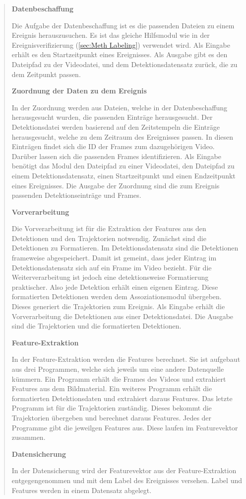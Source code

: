 \begin{quote}
\par
\textbf{Datenbeschaffung}\par
Die Aufgabe der Datenbeschaffung ist es die passenden Dateien zu einem Ereignis herauszusuchen. Es ist das gleiche Hilfsmodul wie in der Ereignisverifizierung (\autoref{sec:Meth Labeling}) verwendet wird. Als Eingabe erhält es den Startzeitpunkt eines Ereignisses. Als Ausgabe gibt es den Dateipfad zu der Videodatei, und dem Detektionsdatensatz zurück, die zu dem Zeitpunkt passen. \dubpar

\textbf{Zuordnung der Daten zu dem Ereignis}\par
In der Zuordnung werden aus Dateien, welche in der Datenbeschaffung herausgesucht wurden, die passenden Einträge herausgesucht. Der Detektionsdatei werden basierend auf den Zeitstempeln die Einträge herausgesucht, welche zu dem Zeitraum des Ereignisses passen. In diesen Einträgen findet sich die ID der Frames zum dazugehörigen Video. Darüber lassen sich die passenden Frames identifizieren. Als Eingabe benötigt das Modul den Dateipfad zu einer Videodatei, den Dateipfad zu einem Detektionsdatensatz, einen Startzeitpunkt und einen Endzeitpunkt eines Ereignisses. Die Ausgabe der Zuordnung sind die zum Ereignis passenden Detektionseinträge und Frames. \dubpar

\textbf{Vorverarbeitung}\par
Die Vorverarbeitung ist für die Extraktion der Features aus den Detektionen und den Trajektorien notwendig. Zunächst sind die Detektionen zu Formatieren. Im Detektionsdatensatz sind die Detektionen frameweise abgespeichert. Damit ist gemeint, dass jeder Eintrag im Detektionsdatensatz sich auf ein Frame im Video bezieht. Für die Weiterverarbeitung ist jedoch eine detektionsweise Formatierung praktischer. Also jede Detektion erhält einen eigenen Eintrag. Diese formatierten Detektionen werden dem Assoziationsmodul übergeben. Dieses generiert die Trajektorien zum Ereignis. Als Eingabe erhält die Vorverarbeitung die Detektionen aus einer Detektionsdatei. Die Ausgabe sind die Trajektorien und die formatierten Detektionen. \dubpar

\textbf{Feature-Extraktion}\par
In der Feature-Extraktion werden die Features berechnet. Sie ist aufgebaut aus drei Programmen, welche sich jeweils um eine andere Datenquelle kümmern. Ein Programm erhält die Frames des Videos und extrahiert Features aus dem Bildmaterial. Ein weiteres Programm erhält die formatierten Detektionsdaten und extrahiert daraus Features. Das letzte Programm ist für die Trajektorien zuständig. Dieses bekommt die Trajektorien übergeben und berechnet daraus Features. Jedes der Programme gibt die jeweilgen Features aus. Diese laufen im Featurevektor zusammen. \dubpar

\textbf{Datensicherung}\par
In der Datensicherung wird der Featurevektor aus der Feature-Extraktion entgegengenommen und mit dem Label des Ereignisses versehen. Label und Features werden in einem Datensatz abgelegt. 

\end{quote}

